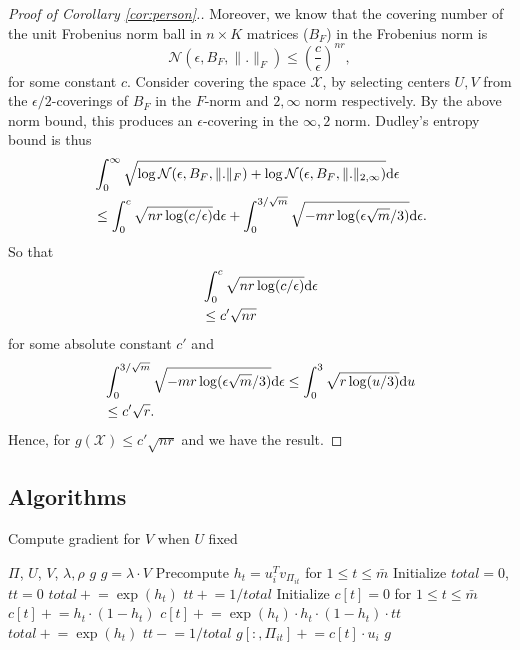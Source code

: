 \documentclass{article}
\def\R{\mathbb{R}}
\def\R{\mathbb{R}}
\begin{document}
\begin{proof}[Proof of Corollary \ref{cor:person}.]
Moreover, we know that the covering number of the unit Frobenius norm ball in $n \times K$ matrices ($B_F$) in the Frobenius norm is 
$$
\mathcal N(\epsilon,B_F,\| . \|_F) \le \left( \frac{c}{\epsilon} \right)^{nr},
$$
for some constant $c$.
Consider covering the space $\mathcal X$, by selecting centers $U,V$ from the $\epsilon/2$-coverings of $B_F$ in the $F$-norm and ${2,\infty}$ norm respectively.
By the above norm bound, this produces an $\epsilon$-covering in the $\infty,2$ norm.  
Dudley's entropy bound is thus
\begin{align*}
&\int_0^\infty \sqrt{\log \mathcal N(\epsilon, B_F, \|.\|_F) + \log \mathcal N (\epsilon, B_F, \|. \|_{2,\infty})} {\rm d} \epsilon \\
&\le \int_0^c \sqrt{nr \log (c / \epsilon)} {\rm d}\epsilon + \int_0^{3/\sqrt m} \sqrt{- mr \log (\epsilon \sqrt m / 3)} {\rm d}\epsilon.
\end{align*}
So that
\begin{align*}
&\int_0^c \sqrt{nr \log (c / \epsilon)} {\rm d}\epsilon \\
&\le c' \sqrt{nr}
\end{align*}
for some absolute constant $c'$ and
\begin{align*}
&\int_0^{3/\sqrt m} \sqrt{- mr \log (\epsilon \sqrt m / 3)} {\rm d}\epsilon \le \int_0^3 \sqrt{r \log (u/3)} {\rm d} u \\
&\le c' \sqrt r.
\end{align*}
Hence, for $g(\mathcal X) \le c' \sqrt{nr}$ and we have the result.
\end{proof}

\subsection{Algorithms}
\begin{algorithm}[tb]
  \caption{Compute gradient for $V$ when $U$ fixed}
  \label{alg:gradv}
\begin{algorithmic}
   $\Pi$, $U$, $V$, $\lambda, \rho$
   $g$ \COMMENT{$g\in \R^{r \times m}$ is the gradient for $f(V)$}
    \STATE $g = \lambda \cdot V$
     \STATE Precompute $h_t = u_i^T v_{\Pi_{it}}$ for $1 \leq t \leq \bar{m}$ 
     \STATE Initialize $total = 0$, $tt = 0$ 
        \STATE $total \mathrel{+}= \exp(h_t)$
        \STATE $tt \mathrel{+}= 1/total$
     \ENDFOR
     \STATE Initialize $c[t] = 0$ for $1 \leq t \leq \bar{m}$ 
        \STATE $c[t] \mathrel{+}= h_t \cdot (1 - h_t) $
        \STATE $c[t] \mathrel{+}= \exp(h_t) \cdot h_t \cdot (1 - h_t) \cdot tt$
        \STATE $total \mathrel{+}= \exp(h_t)$
        \STATE $tt \mathrel{-}= 1 / total$
     \ENDFOR
        \STATE $g[:, \Pi_{it}] \mathrel{+}= c[t] \cdot u_i$
    \ENDFOR
  \ENDFOR 
   $g$
\end{algorithmic}
\end{algorithm}
\end{document}
